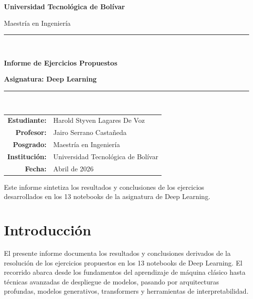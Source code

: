 \documentclass[12pt, a4paper]{article}
\begin{document}

\begin{titlepage}
  \centering
  \vspace*{1.5cm}
  {\Large\bfseries\color{azulutb} Universidad Tecnológica de Bolívar \par}
  \vspace{0.3cm}
  {\large Maestría en Ingeniería \par}
  \vspace{2cm}
  \rule{\linewidth}{1.2pt}\\[0.4cm]
  {\LARGE\bfseries Informe de Ejercicios Propuestos \par}
  {\large\bfseries Asignatura: Deep Learning \par}
  \rule{\linewidth}{1.2pt}\\[2cm]

  \begin{tabular}{rl}
    \textbf{Estudiante:} & Harold Styven Lagares De Voz \\[4pt]
    \textbf{Profesor:}   & Jairo Serrano Castañeda \\[4pt]
    \textbf{Posgrado:}   & Maestría en Ingeniería \\[4pt]
    \textbf{Institución:} & Universidad Tecnológica de Bolívar \\[4pt]
    \textbf{Fecha:}      & Abril de 2026 \\
  \end{tabular}

  \vfill
  {\small\textcolor{grisnota}{Este informe sintetiza los resultados y conclusiones de los ejercicios\\
  desarrollados en los 13 notebooks de la asignatura de Deep Learning.}}
\end{titlepage}

\tableofcontents
\newpage

\section{Introducción}

El presente informe documenta los resultados y conclusiones derivados de la resolución de los ejercicios propuestos en los 13 notebooks de Deep Learning. El recorrido abarca desde los fundamentos del aprendizaje de máquina clásico hasta técnicas avanzadas de despliegue de modelos, pasando por arquitecturas profundas, modelos generativos, transformers y herramientas de interpretabilidad.
\end{document}
